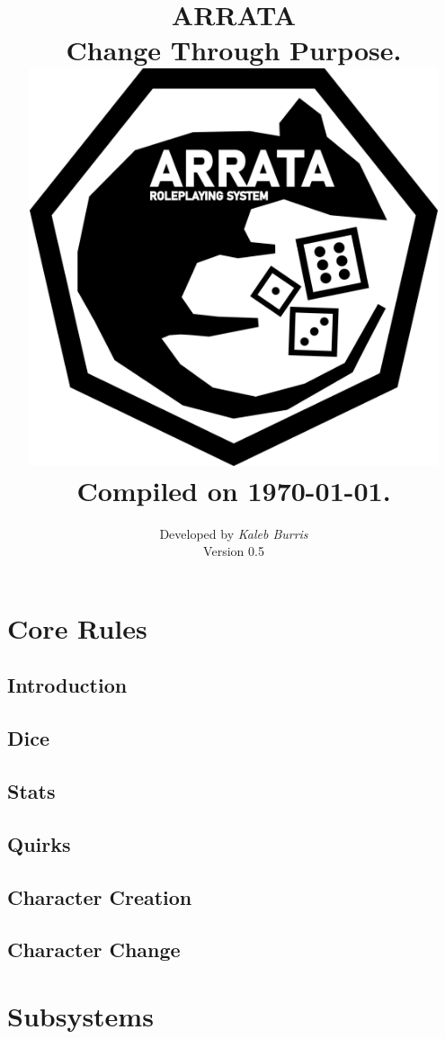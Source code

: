 \documentclass[12pt, oneside]{book}
\title{
    \textbf{ARRATA} 
    \\
    \large Change Through Purpose.
    \\
    \includegraphics[width=12cm]{rat.png}
    \\
    Compiled on \today.
}
\date{}
\author{
    Developed by {\em Kaleb Burris} \\
    Version 0.5
}
\newcommand\blankpage{%
    \null
    \thispagestyle{empty}%
    \addtocounter{page}{-1}%
    \newpage}
\begin{document}
    \let\cleardoublepage\clearpage

    \setlength{\headsep}{1cm}
    \setlength{\headheight}{30.0pt}
    \addtolength{\topmargin}{-0.75cm}

    \maketitle

    \afterpage{\blankpage}

    \tableofcontents

    \part{Core Rules}

    \chapter{Introduction}
    

    \chapter{Dice}
    

    \chapter{Stats}
    

    \chapter{Quirks}

    \chapter{Character Creation}

    \chapter{Character Change}

    \part{Subsystems}
\end{document}
